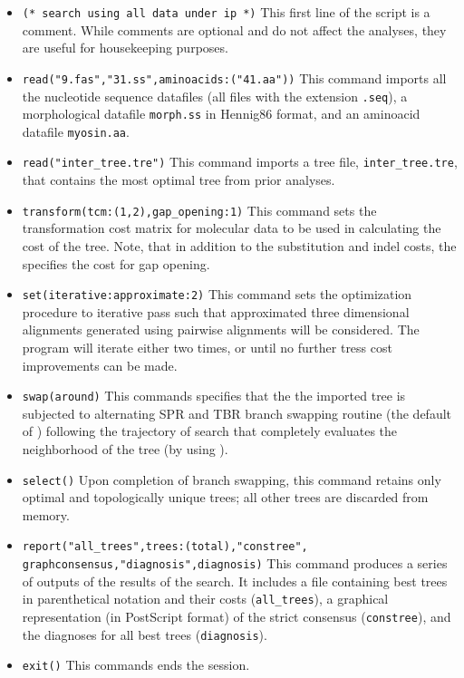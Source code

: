\begin{itemize}
\item \texttt{(* search using all data under ip *)} This first line of the script is a comment. While comments are optional and do not affect the analyses, they are useful for housekeeping purposes.
\item \texttt{read("9.fas","31.ss",aminoacids:("41.aa"))} This command imports all the nucleotide sequence datafiles (all files with the extension \texttt{.seq}), a morphological datafile \texttt{morph.ss} in Hennig86 format, and an aminoacid datafile \texttt{myosin.aa}.
\item \texttt{read("inter\_tree.tre")} This command imports a tree file, \texttt{inter\_tree.tre}, that contains the most optimal tree from prior analyses. 
\item \texttt{transform(tcm:(1,2),gap\_opening:1)} This command sets the transformation cost matrix for molecular data to be used in calculating the cost of the tree. Note, that in addition to the substitution and indel costs, the  specifies the cost for gap opening.
\item \texttt{set(iterative:approximate:2)} This command sets the optimization procedure
    to iterative pass such that approximated three dimensional alignments generated using pairwise alignments will be considered.  The program will iterate either two times, or until no further tress cost improvements can be made.
\item \texttt{swap(around)} This commands specifies that the the imported tree is subjected to alternating SPR and TBR branch swapping routine (the default of \poy) following the trajectory of search that completely evaluates the neighborhood of the tree (by using ).
\item \texttt{select()} Upon completion of branch swapping, this command retains only optimal and topologically unique trees; all other trees are discarded from memory.
\item \texttt{report("all\_trees",trees:(total),"constree",\\graphconsensus,"diagnosis",diagnosis)} This command produces a series of outputs of the results of the search. It includes a file containing best trees in parenthetical notation and their costs (\texttt{all\_trees}), a graphical representation (in PostScript format) of the strict consensus (\texttt{constree}), and the diagnoses for all best trees (\texttt{diagnosis}).
\item \texttt{exit()} This commands ends the \poy session.
\end{itemize}


